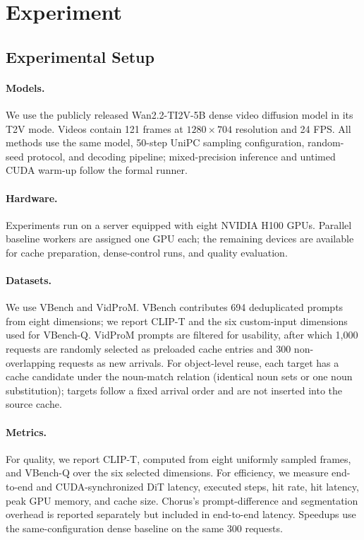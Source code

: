 \section{Experiment}
\subsection{Experimental Setup}
\paragraph{Models.}
We use the publicly released Wan2.2-TI2V-5B dense video diffusion model in its
T2V mode. Videos contain 121 frames at $1280\times704$ resolution and 24 FPS.
All methods use the same model, 50-step UniPC sampling configuration, random-seed
protocol, and decoding pipeline; mixed-precision inference and untimed CUDA
warm-up follow the formal runner.

\paragraph{Hardware.}
Experiments run on a server equipped with eight NVIDIA H100 GPUs. Parallel
baseline workers are assigned one GPU each; the remaining devices are available
for cache preparation, dense-control runs, and quality evaluation.

\paragraph{Datasets.}
We use VBench and VidProM. VBench contributes 694 deduplicated prompts from eight
dimensions; we report CLIP-T and the six custom-input dimensions used for
VBench-Q. VidProM prompts are filtered for usability, after which 1,000 requests
are randomly selected as preloaded cache entries and 300 non-overlapping requests
as new arrivals. For object-level reuse, each target has a cache candidate under
the noun-match relation (identical noun sets or one noun substitution); targets
follow a fixed arrival order and are not inserted into the source cache.

\paragraph{Metrics.}
For quality, we report CLIP-T, computed from eight uniformly sampled frames, and
VBench-Q over the six selected dimensions. For efficiency, we measure end-to-end
and CUDA-synchronized DiT latency, executed steps, hit rate, hit latency, peak
GPU memory, and cache size. Chorus's prompt-difference and segmentation overhead
is reported separately but included in end-to-end latency. Speedups use the
same-configuration dense baseline on the same 300 requests.

